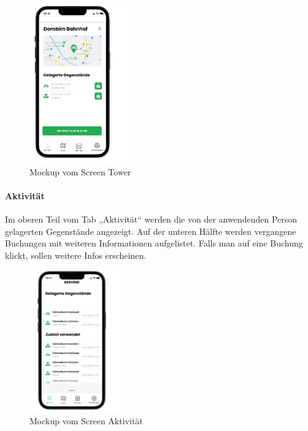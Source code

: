 \begin{figure}[H]
  \centering
  \includegraphics[width=0.4\textwidth]{images/app_mock_tower}
  \caption{\Gls{Mockup} vom Screen Tower}
  \label{fig:screentowermock}
\end{figure}

\medskip
\clearpage

\paragraph{Aktivität}Im oberen Teil vom \Gls{Tab} „Aktivität“ werden die von der anwendenden Person gelagerten Gegenstände angezeigt. Auf der unteren Hälfte werden vergangene Buchungen mit weiteren Informationen aufgelistet. Falls man auf eine Buchung klickt, sollen weitere Infos erscheinen.

\begin{figure}[H]
  \centering
  \includegraphics[width=0.35\textwidth]{images/app_mock_objects}
  \caption{\Gls{Mockup} vom Screen Aktivität}
  \label{fig:screenactivitymock}
\end{figure}

